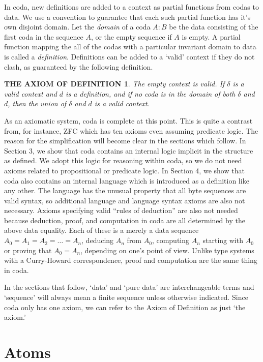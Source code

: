 \documentclass[11pt]{article}
\begin{document}
     In coda, new definitions are added to a context as partial functions from codas to data.  We use a convention to guarantee that each such partial
function has it's own disjoint domain.  Let the {\it domain} of a coda $A:B$ be the data consisting of the first coda in the sequence $A$, or the empty
sequence if $A$ is empty.  A partial function mapping the all of the codas with a particular invariant domain to data is called a {\it definition}.  Definitions
can be added to a `valid' context if they do not clash, as guaranteed by the following definition.
\newtheorem*{remark}{THE AXIOM OF DEFINITION}
\begin{remark}  The empty context is valid.  If $\delta$ is a valid context and $d$ is a definition, and if no coda is in
the domain of both $\delta$ and $d$, then the union of $\delta$ and $d$ is a valid context.
\end{remark}
\noindent As an axiomatic system, coda is complete at this point.  This is quite a contrast from, for instance, ZFC which has ten axioms
even assuming predicate logic\cite{ZFC}.  The reason for the simplification will become clear in the sections which follow.  In Section 3, we show
that coda contains an internal logic implicit in the structure as defined.  We adopt this logic for reasoning within coda, so we do not
need axioms related to propositional or predicate logic.  In Section 4, we show that coda also contains an internal language which is introduced 
as a definition like any other.  The language has the unusual property that all byte sequences are valid syntax,
so additional language and language syntax axioms are also not necessary.  Axioms specifying valid ``rules of deduction'' are also not needed
because deduction, proof, and computation in coda are all determined by the above data equality.  Each of these is a merely a data sequence $A_0=A_1=A_2=\dots=A_n$,
deducing $A_n$ from $A_0$, computing $A_n$ starting with $A_0$ or proving that $A_0=A_n$, depending on one's point of view.
Unlike type systems with a Curry-Howard correspondence, proof and computation are the same thing in coda.

In the sections that follow,
`data' and `pure data' are interchangeable terms and `sequence' will always mean a finite sequence unless otherwise indicated.  Since coda
only has one axiom, we can refer to the Axiom of Definition as just `the axiom.'

\section{Atoms}
\end{document}
